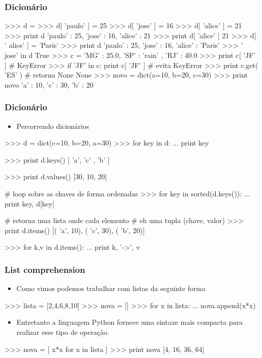 \documentclass[12pt,t,graphics]{beamer}
\newcommand{\ft}[1]{\frametitle{#1}}
\newcommand{\bi}{\begin{itemize}}
\newcommand{\ei}{\end{itemize}}
\begin{document}

\begin{frame}[fragile]
  \ft{Dicionário}
  \vspace{-0.25cm}
  \begin{python}
>>> d = {}
>>> d[ 'paulo' ] = 25
>>> d[ 'jose' ] = 16
>>> d[ 'alice' ] = 21
>>> print d
{'paulo' : 25, 'jose' : 16, 'alice' : 21}
>>> print d[ 'alice' ]
21
>>> d[ ' alice' ] = 'Paris'
>>> print d
{'paulo' : 25, 'jose' : 16, 'alice' : 'Paris' }
>>> ' jose' in d
True
>>> c = {'MG' : 25.0, 'SP' : 'rain' , 'RJ' : 40.0}
>>> print c[ 'JF' ] # KeyError
>>> if 'JF' in c: print c[ 'JF' ] # evita KeyError
>>> print c.get( 'ES' ) # retorna None
None
>>> novo = dict(a=10, b=20, c=30)
>>> print novo
{'a' : 10, 'c' : 30, 'b' : 20}		
  \end{python}
\end{frame}


\begin{frame}[fragile]
  \ft{Dicionário}
  \vspace{-0.25cm}
  \bi
\item Percorrendo dicionários
  \ei
  \begin{python}
>>> d = dict(c=10, b=20, a=30)
>>> for key in d:
...     print key

>>> print d.keys()
[ 'a', 'c' , 'b' ]

>>> print d.values()
[30, 10, 20]

# loop sobre as chaves de forma ordenadas
>>> for key in sorted(d.keys()):
...     print key, d[key]

# retorna uma lista onde cada elemento 
# eh uma tupla (chave, valor)
>>> print d.items()
[( 'a', 10), ( 'c', 30), ( 'b', 20)]

>>> for k,v in d.items(): 
...     print k, '->', v		
  \end{python}	
\end{frame}


\begin{frame}[fragile]
  \ft{List comprehension}
  \bi
\item Como vimos podemos trabalhar com listas
  da seguinte forma
  \ei
  \begin{python}
>>> lista = [2,4,6,8,10]
>>> nova = []
>>> for x in lista:
...     nova.append(x*x)		
  \end{python}
  \bi
\item Entretanto a linguagem Python fornece uma
  sintaxe mais compacta para realizar esse tipo de
  operação.
  \ei
  \begin{python}
>>> nova = [ x*x for x in lista ]
>>> print nova
[4, 16, 36, 64]		
  \end{python}
\end{frame}
\end{document}
